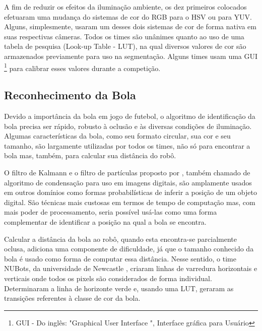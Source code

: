 A fim de reduzir os efeitos da iluminação ambiente, os dez primeiros colocados efetuaram uma mudança do sistemas de cor do RGB para o HSV ou para YUV. Alguns, simplesmente, usaram um desses dois sistemas de cor de forma nativa em suas respectivas câmeras. Todos os times são unânimes quanto ao uso de uma tabela de pesquisa (Look-up Table - LUT), na qual diversos valores de cor são armazenados previamente para uso na segmentação. Alguns times usam uma GUI \footnote{GUI - Do inglês: "Graphical User Interface ", Interface gráfica para Usuário} para calibrar esses valores durante a competição.

\subsection{Reconhecimento da Bola}

Devido a importância da bola em jogo de futebol, o algoritmo de identificação da bola precisa ser rápido, robusto à oclusão e às diversas condições de iluminação. Algumas características da bola, como seu formato circular, sua cor e seu tamanho, são largamente utilizadas por todos os times, não só para encontrar a bola mas, também, para calcular sua distância do robô. 


O filtro de Kalmann \cite{Kalmman} e o filtro de partículas proposto por , também chamado de algoritmo de condensação  \cite{Condensation} para uso em imagens digitais, são amplamente usados em outros domínios como formas probabilísticas de inferir a posição de um objeto digital. São técnicas mais custosas em termos de tempo de computação mas, com mais poder de processamento, seria possível usá-las como uma forma complementar de identificar a posição na qual a bola se encontra.
 
Calcular a distância da bola ao robô, quando esta encontra-se parcialmente oclusa, adiciona uma componente de dificuldade, já que o tamanho conhecido da bola é usado como forma de computar essa distância. Nesse sentido, o time NUBots, da universidade de Newcastle \cite{Bunden}, criaram linhas de varredura horizontais e verticais onde todos os pixels são considerados de forma individual. Determinaram a linha de horizonte verde e, usando uma LUT, geraram as transições referentes à classe de cor da bola. 

